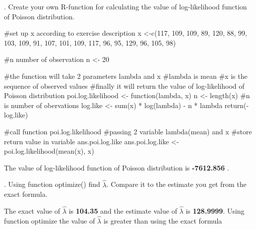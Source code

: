 \documentclass[12pt, oneside]{report}\usepackage[]{graphicx}\usepackage[]{color}
\begin{document}
. Create your own R-function for calculating the value of log-likelihood function of Poisson distribution.
\begin{Schunk}
\begin{Sinput}
#set up x according to exercise description
x <-c(117, 109, 109, 89, 120, 88, 99, 103, 109, 91, 107, 101, 109, 117, 96, 95, 129, 96, 105, 98)

#n number of observation
n <- 20

#the function will take 2 parameters lambda and x
#lambda is mean
#x is the sequence of observed values
#finally it will return the value of log-likelihood of Poisson distribution
poi.log.likelihood <- function(lambda, x){
  n <- length(x) #n is number of obervations
  log.like <- sum(x) * log(lambda) - n * lambda
  return(-log.like)
}

#call function poi.log.likelihood 
#passing 2 variable lambda(mean) and x
#store return value in variable ans.poi.log.like
ans.poi.log.like <- poi.log.likelihood(mean(x), x)
\end{Sinput}
\end{Schunk}
The value of log-likelihood function of Poisson distribution is {\bf -7612.856 }. \newline

. Using function optimize() find $\hat{\lambda}$. Compare it to the estimate you get from the exact formula.
\begin{Schunk}
\end{Schunk}
The exact value of $\hat{\lambda}$ is {\bf 104.35} and the estimate value of $\hat{\lambda}$ is {\bf 128.9999}. \newline
Using function optimize the value of $\hat{\lambda}$ is greater than using the exact formula \newline
\end{document}
